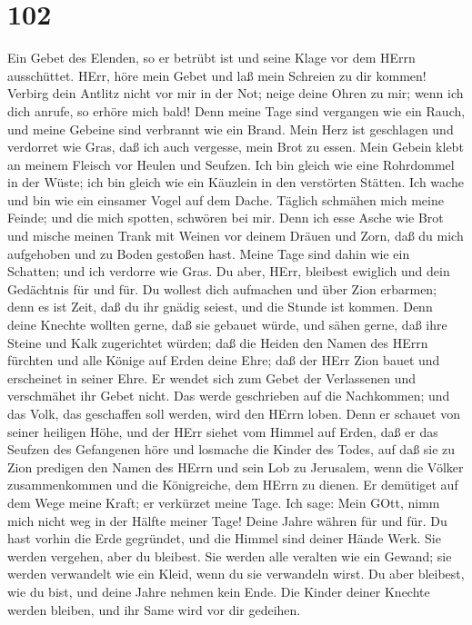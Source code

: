 \hypertarget{section-101}{%
\section{102}\label{section-101}}

 Ein Gebet des Elenden, so er betrübt ist und seine Klage
vor dem HErrn ausschüttet.  HErr, höre mein Gebet und laß
mein Schreien zu dir kommen!  Verbirg dein Antlitz nicht vor
mir in der Not; neige deine Ohren zu mir; wenn ich dich anrufe, so
erhöre mich bald!  Denn meine Tage sind vergangen wie ein
Rauch, und meine Gebeine sind verbrannt wie ein Brand.  Mein
Herz ist geschlagen und verdorret wie Gras, daß ich auch vergesse, mein
Brot zu essen.  Mein Gebein klebt an meinem Fleisch vor
Heulen und Seufzen.  Ich bin gleich wie eine Rohrdommel in
der Wüste; ich bin gleich wie ein Käuzlein in den verstörten Stätten.
 Ich wache und bin wie ein einsamer Vogel auf dem Dache.
 Täglich schmähen mich meine Feinde; und die mich spotten,
schwören bei mir.  Denn ich esse Asche wie Brot und mische
meinen Trank mit Weinen  vor deinem Dräuen und Zorn, daß du
mich aufgehoben und zu Boden gestoßen hast.  Meine Tage
sind dahin wie ein Schatten; und ich verdorre wie Gras.  Du
aber, HErr, bleibest ewiglich und dein Gedächtnis für und für.
 Du wollest dich aufmachen und über Zion erbarmen; denn es
ist Zeit, daß du ihr gnädig seiest, und die Stunde ist kommen.
 Denn deine Knechte wollten gerne, daß sie gebauet würde,
und sähen gerne, daß ihre Steine und Kalk zugerichtet würden;
 daß die Heiden den Namen des HErrn fürchten und alle
Könige auf Erden deine Ehre;  daß der HErr Zion bauet und
erscheinet in seiner Ehre.  Er wendet sich zum Gebet der
Verlassenen und verschmähet ihr Gebet nicht.  Das werde
geschrieben auf die Nachkommen; und das Volk, das geschaffen soll
werden, wird den HErrn loben.  Denn er schauet von seiner
heiligen Höhe, und der HErr siehet vom Himmel auf Erden, 
daß er das Seufzen des Gefangenen höre und losmache die Kinder des
Todes,  auf daß sie zu Zion predigen den Namen des HErrn
und sein Lob zu Jerusalem,  wenn die Völker zusammenkommen
und die Königreiche, dem HErrn zu dienen.  Er demütiget auf
dem Wege meine Kraft; er verkürzet meine Tage.  Ich sage:
Mein GOtt, nimm mich nicht weg in der Hälfte meiner Tage! Deine Jahre
währen für und für.  Du hast vorhin die Erde gegründet, und
die Himmel sind deiner Hände Werk.  Sie werden vergehen,
aber du bleibest. Sie werden alle veralten wie ein Gewand; sie werden
verwandelt wie ein Kleid, wenn du sie verwandeln wirst.  Du
aber bleibest, wie du bist, und deine Jahre nehmen kein Ende.
 Die Kinder deiner Knechte werden bleiben, und ihr Same
wird vor dir gedeihen.

